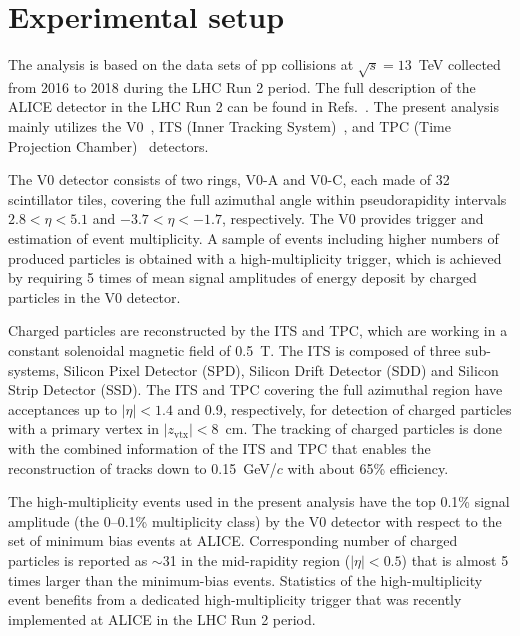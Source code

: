 

\section{Experimental setup}
\label{sec:experiment}

The analysis is based on the data sets of pp collisions at $\sqrt{s} = 13$~TeV collected from 2016 to 2018 during the LHC Run 2 period. The full description of the ALICE detector in the LHC Run 2 can be found in Refs.~\cite{Aamodt:2008zz,Abelev:2014ffa}. The present analysis mainly utilizes the V0~\cite{Abbas:2013taa}, ITS (Inner Tracking System)~\cite{aliceITS}, and TPC (Time Projection Chamber)~\cite{aliceTPC} detectors.


The V0 detector consists of two rings, V0-A and V0-C, each made of 32 scintillator tiles, covering the full azimuthal angle within pseudorapidity intervals $2.8 < \eta < 5.1$ and $-3.7 < \eta < -1.7$, respectively. The V0 provides trigger and estimation of event multiplicity. A sample of events including higher numbers of produced particles is obtained with a high-multiplicity trigger, which is achieved by requiring 5 times of mean signal amplitudes of energy deposit by charged particles in the V0 detector.

Charged particles are reconstructed by the ITS and TPC, which are working in a constant solenoidal magnetic field of 0.5~T. The ITS is composed of three sub-systems, Silicon Pixel Detector (SPD), Silicon Drift Detector (SDD) and Silicon Strip Detector (SSD). The ITS and TPC covering the full azimuthal region have acceptances up to $|\eta| < 1.4$ and 0.9, respectively, for detection of charged particles with a primary vertex in $|z_\mathrm{vtx}| < 8$~cm. The tracking of charged particles is done with the combined information of the ITS and TPC that enables the reconstruction of tracks down to 0.15~GeV/$c$ with about 65\% efficiency.

The high-multiplicity events used in the present analysis have the top 0.1\% signal amplitude (the 0--0.1\% multiplicity class) by the V0 detector with respect to the set of minimum bias events at ALICE. Corresponding number of charged particles is reported as $\sim$31 in the mid-rapidity region ($|\eta|<0.5$) that is almost 5 times larger than the minimum-bias events. Statistics of the high-multiplicity event benefits from a dedicated high-multiplicity trigger that was recently implemented at ALICE  in the LHC Run 2 period.  
 


